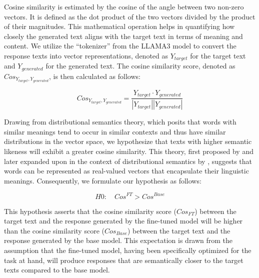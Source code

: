 Cosine similarity is estimated by the cosine of the angle between two non-zero vectors. It is defined as the dot product of the two vectors divided by the product of their magnitudes. This mathematical operation helps in quantifying how closely the generated text aligns with the target text in terms of meaning and content. We utilize the ``tokenizer'' from the LLAMA3 model to convert the response texts into vector representations, denoted as $Y_{target}$ for the target text and $Y_{generated}$ for the generated text. The cosine similarity score, denoted as $Cos_{Y_{target}, Y_{generated}}$, is then calculated as follows:


\begin{equation*}
    Cos_{Y_{target}, Y_{generated}} = \frac{Y_{target} \cdot Y_{generated}}{|Y_{target}| |Y_{generated}|}
\end{equation*}


Drawing from distributional semantics theory, which posits that words with similar meanings tend to occur in similar contexts and thus have similar distributions in the vector space, we hypothesize that texts with higher semantic likeness will exhibit a greater cosine similarity. This theory, first proposed by \cite{firth1957linguistics} and later expanded upon in the context of distributional semantics by \cite{sahlgren2008distributional}, suggests that words can be represented as real-valued vectors that encapsulate their linguistic meanings. Consequently, we formulate our hypothesis as follows:

\begin{equation*}
    H0:\quad Cos^{FT} > Cos^{Base}
\end{equation*}

This hypothesis asserts that the cosine similarity score ($Cos_{FT}$) between the target text  and the response generated by the fine-tuned model will be higher than the cosine similarity score ($Cos_{Base}$) between the target text and the response generated by the base model. This expectation is drawn from the assumption that the fine-tuned model, having been specifically optimized for the task at hand, will produce responses that are semantically closer to the target texts compared to the base model. 










